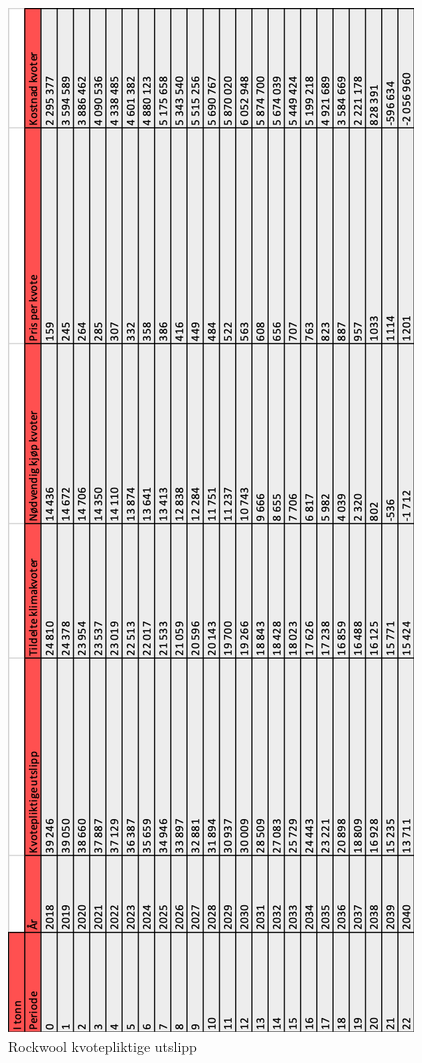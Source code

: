 \begin{figure}[H]
\centering
\includegraphics [scale=0.8]{appendiks/bilder/co2kvote.png}
\caption{Rockwool kvotepliktige utslipp}
\label{fig:co2kvote}
\end{figure}

